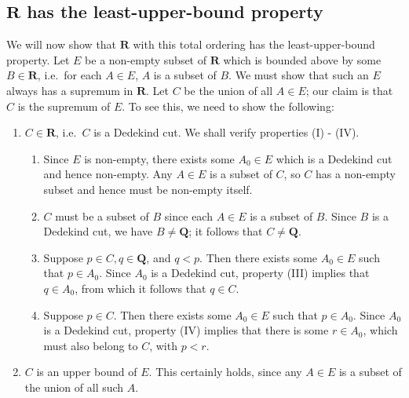 \documentclass[12pt]{article}
\newcommand{\Q}{\mathbf{Q}}
\newcommand{\R}{\mathbf{R}}
\theoremstyle{definition}
\begin{document}
\subsection{\texorpdfstring{\(\R\)}{} has the least-upper-bound property}
\label{sec:R_has_lub_property}

We will now show that \( \R \) with this total ordering has the least-upper-bound property. Let \( E \) be a non-empty subset of \( \R \) which is bounded above by some \( B \in \R \), i.e.\ for each \( A \in E \), \( A \) is a subset of \( B \). We must show that such an \( E \) always has a supremum in \( \R \). Let \( C \) be the union of all \( A \in E \); our claim is that \( C \) is the supremum of \( E \). To see this, we need to show the following:

\begin{enumerate}[label = (S\arabic*)]
    \item \( C \in \R \), i.e.\ \( C \) is a Dedekind cut. We shall verify properties (I) - (IV).
    
    \begin{enumerate}[label = (\Roman*)]
        \item Since \( E \) is non-empty, there exists some \( A_0 \in E \) which is a Dedekind cut and hence non-empty. Any \( A \in E \) is a subset of \( C \), so \( C \) has a non-empty subset and hence must be non-empty itself.
        
        \item \( C \) must be a subset of \( B \) since each \( A \in E \) is a subset of \( B \). Since \( B \) is a Dedekind cut, we have \( B \neq \Q \); it follows that \( C \neq \Q \).
        
        \item Suppose \( p \in C, q \in \Q \), and \( q < p \). Then there exists some \( A_0 \in E \) such that \( p \in A_0 \). Since \( A_0 \) is a Dedekind cut, property (III) implies that \( q \in A_0 \), from which it follows that \( q \in C \).
        
        \item Suppose \( p \in C \). Then there exists some \( A_0 \in E \) such that \( p \in A_0 \). Since \( A_0 \) is a Dedekind cut, property (IV) implies that there is some \( r \in A_0 \), which must also belong to \( C \), with \( p < r \).
    \end{enumerate}
    
    \item \( C \) is an upper bound of \( E \). This certainly holds, since any \( A \in E \) is a subset of the union of all such \( A \).
    

\end{enumerate}
\end{document}
